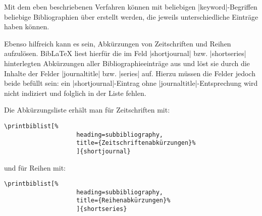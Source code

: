 \documentclass[a4paper,10pt,ngerman]{ltxdoc}
\begin{document}
\begin{refsection}
\nocite{Cic:Att,Fest,%
Ball2013,Taylor2008,Mann2011,Mundt2015,Kurapkat2014,%
Wulf-Rheidt2013,Bergmann2015,LTUR,Nieddu1995,Arnolds2005}

\setcounter{section}{0}
\begin{bsp}
\renewcommand\bibfont{\normalfont\footnotesize}
\printbibheading[%
							heading=bibliography,
							title={Bibliographie}]%

\printbibliography[%
							heading=subbibliography,
							keyword=ancient,%
							title={Antike Quellen}]

\printbibliography[%
							heading=subbibliography,
              				keyword=corpus,%
              				title={Abkürzungen und Sigel}]

\printbibliography[%
							heading=subbibliography,
							notkeyword=ancient,%
							notkeyword=corpus,%
							title={Forschungsliteratur}]
\end{bsp}

Mit dem eben beschriebenen Verfahren können mit beliebigen |keyword|-Begriffen beliebige Bibliographien über  erstellt werden, die jeweils unterschiedliche Einträge haben können.

Ebenso hilfreich kann es sein, Abkürzungen von Zeitschriften und Reihen aufzulösen. Bib\LaTeX{} liest hierfür die im Feld |shortjournal| bzw. |shortseries| hinterlegten Abkürzungen aller Bibliographieeinträge aus und löst sie durch die Inhalte der Felder |journaltitle| bzw. |series| auf. Hierzu müssen die Felder jedoch beide befüllt sein: ein |shortjournal|-Eintrag ohne |journaltitle|-Entsprechung wird nicht indiziert und folglich in der Liste fehlen.

Die Abkürzungsliste erhält man für Zeitschriften mit:
\begin{lstlisting}
\printbiblist[%
					heading=subbibliography,
					title={Zeitschriftenabkürzungen}%
					]{shortjournal}
\end{lstlisting}

\begin{bsp}
\end{bsp}

und für Reihen mit:
\begin{lstlisting}
\printbiblist[%
					heading=subbibliography,
					title={Reihenabkürzungen}%
					]{shortseries}
\end{lstlisting}

\begin{bsp}
\end{bsp}
\end{refsection}
\end{document}
